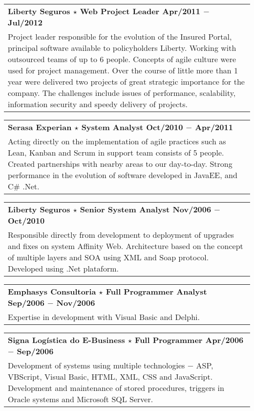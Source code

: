 \documentclass[a4paper, oneside, final]{scrartcl}
\newcommand{\vspc}{\vspace{0.15cm}} %
\begin{document}
\begin{center}
\begin{tabularx}{1\linewidth}{X}
{\bf Liberty Seguros $\star$ Web Project Leader \hfill Apr/2011 $-$ Jul/2012} \\
Project leader responsible for the evolution of the Insured Portal, principal software available to policyholders Liberty. Working with outsourced teams of up to 6 people. Concepts of agile culture were used for project management. Over the course of little more than 1 year were delivered two projects of great strategic importance for the company. The challenges include issues of performance, scalability, information security and speedy delivery of projects. \vspc\\
\end{tabularx}

\begin{tabularx}{1\linewidth}{X}
{\bf Serasa Experian $\star$  System Analyst \hfill Oct/2010 $-$ Apr/2011} \\
Acting directly on the implementation of agile practices such as Lean, Kanban and Scrum in support team consists of 5 people. Created partnerships with nearby areas to our day-to-day. Strong performance in the evolution of software developed in JavaEE, and C\# .Net. \vspc\\
\end{tabularx}

\begin{tabularx}{1\linewidth}{X}
{\bf Liberty Seguros $\star$ Senior System Analyst \hfill Nov/2006 $-$ Oct/2010} \\
Responsible directly from development to deployment of upgrades and fixes on system Affinity Web. Architecture based on the concept of multiple layers and SOA using XML and Soap protocol. Developed using .Net plataform.\vspc\\
\end{tabularx}

\begin{tabularx}{1\linewidth}{X}
{\bf Emphasys Consultoria $\star$ Full Programmer Analyst \hfill Sep/2006 $-$ Nov/2006} \\
Expertise in development with Visual Basic and Delphi. \vspc\\
\end{tabularx}

\begin{tabularx}{1\linewidth}{X}
{\bf Signa Logística do E-Business $\star$ Full Programmer \hfill Apr/2006 $-$ Sep/2006} \\
Development of systems using multiple technologies $-$ ASP, VBScript, Visual Basic, HTML, XML, CSS and JavaScript. Development and maintenance of stored procedures, triggers in Oracle systems and Microsoft SQL Server. \vspc\\
\end{tabularx}


\end{center}
\end{document}
